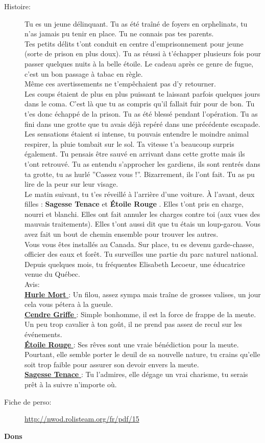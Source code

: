 \documentclass[oneside,12pt]{book}
\newcommand{\Lynn}{\textbf{Étoile Rouge} }
\newcommand{\Jessica}{\textbf{Sagesse Tenace} }
\newcommand{\Luke}{\textbf{Cendre Griffe} }
\newcommand{\Peter}{\textbf{Hurle Mort} }
\begin{document}
\begin{flushleft}
\begin{description}
\item[Histoire:]{
Tu es un jeune délinquant. Tu as été traîné de foyers en orphelinats, tu n’as jamais pu tenir en place. Tu ne connais pas tes parents.\\
Tes petits délits t’ont conduit en centre d’emprisonnement pour jeune (sorte de prison en plus doux). Tu as réussi à t’échapper plusieurs fois pour passer quelques nuits à la belle étoile. Le cadeau après ce genre de fugue, c’est un bon passage à tabac en règle.\\
Même ces avertissements ne t’empêchaient pas d’y retourner.\\
Les coups étaient de plus en plus puissant te laissant parfois quelques jours dans le coma. C’est là que tu as compris qu’il fallait fuir pour de bon. Tu t’es donc échappé de la prison. Tu as été blessé pendant l’opération. Tu as fini dans une grotte que tu avais déjà repéré dans une précédente escapade. Les sensations étaient si intense, tu pouvais entendre le moindre animal respirer, la pluie tombait sur le sol. Ta vitesse t’a beaucoup surpris également. Tu pensais être sauvé en arrivant dans cette grotte mais ils t’ont retrouvé. Tu as entendu s’approcher les gardiens, ils sont rentrés dans ta grotte, tu as hurlé ”Cassez vous !”. Bizarrement, ils l’ont fait. Tu as pu lire de la peur sur leur visage.\\
Le matin suivant, tu t'es réveillé à l'arrière d'une voiture. À l'avant, deux filles : \Jessica et \Lynn. Elles t'ont pris en charge, nourri et blanchi. 
Elles ont fait annuler les charges contre toi (aux vues des mauvais traitements). Elles t'ont aussi dit que tu étais un loup-garou. Vous avez fait un bout de chemin ensemble pour trouver les autres. \\
Vous vous êtes installés au Canada. Sur place, tu es devenu garde-chasse, officier des eaux et forêt. Tu surveilles une partie du parc naturel national. \\ 
Depuis quelques mois, tu fréquentes Elisabeth Lecoeur, une éducatrice venue du Québec.\\ 
Avis:\\
\underline{\Peter} : Un filou, assez sympa mais traîne de grosses valises, un jour cela vous pétera à la gueule.\\
\underline{\Luke} : Simple bonhomme, il est la force de frappe de la meute. Un peu trop cavalier à ton goût, il ne prend pas assez de recul sur les événements.\\
\underline{\Lynn}  : Ses rêves sont une vraie bénédiction pour la meute. Pourtant, elle semble porter le deuil de sa nouvelle nature, tu crains qu'elle soit trop faible pour assurer son devoir envers la meute.\\
\underline{\Jessica}: Tu l'admires, elle dégage un vrai charisme, tu serais prêt à la suivre n'importe où.\\
}
\item[Fiche de perso:]{\href{http://nwod.rolisteam.org/fr/pdf/15}{http://nwod.rolisteam.org/fr/pdf/15}}
\end{description}
\clearpage
\textbf{\large Dons} 
\vspace{0.5cm}


\end{flushleft}
\end{document}
